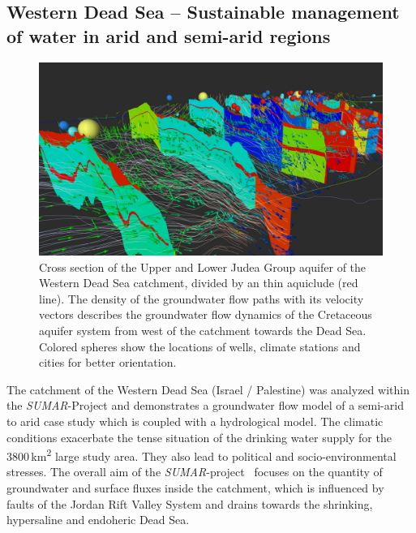 \documentclass[twocolumn]{svjour3}          %
\begin{document}
\subsection{Western Dead Sea -- Sustainable management of water in arid and semi-arid regions}
\label{western-dead-sea---sustainable-management-of-water-in-arid-and-semi-arid-regions}

\begin{figure}[htb]
  \includegraphics[width=\linewidth]{images/deadsea.jpg}
\caption{Cross section of the Upper and Lower Judea Group aquifer of the Western Dead Sea catchment, divided by an thin aquiclude (red line). The density of the groundwater flow paths with its velocity vectors describes the groundwater flow dynamics of the Cretaceous aquifer system from west of the catchment towards the Dead Sea. Colored spheres show the locations of wells, climate stations and cities for better orientation.}
\label{fig:deadsea}
\end{figure}

The catchment of the Western Dead Sea (Israel / Palestine) was analyzed within the \emph{SUMAR}-Project and de\-mon\-strates a groundwater flow model of a semi-arid to arid case study which is coupled with a hydrological model. The climatic conditions exacerbate the tense situation of the drinking water supply for the 3800\,km\textsuperscript{2} large study area. They also lead to political and socio-environmental stresses. The overall aim of the \emph{SU\-MAR}-project~\cite{Siebert:2014} focuses on the quantity of groundwater and surface fluxes inside the catchment, which is influenced by faults of the Jordan Rift Valley System and drains towards the shrinking, hypersaline and endoheric Dead Sea.
\end{document}
